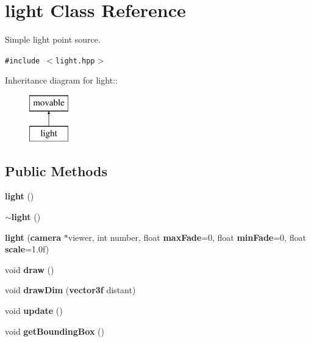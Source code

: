 \section{light  Class Reference}
\label{classlight}
Simple light point source. 


{\tt \#include $<$light.hpp$>$}

Inheritance diagram for light::\begin{figure}[H]
\begin{center}
\leavevmode
\includegraphics[height=2cm]{classlight}
\end{center}
\end{figure}
\subsection*{Public Methods}
\begin{CompactItemize}
\item 
{}
{\bf light} ()\label{classlight_a0}

\item 
{}
{\bf $\sim$light} ()\label{classlight_a1}

\item 
{}
{\bf light} ({\bf camera} $\ast$viewer, int number, float {\bf max\-Fade}=0, float {\bf min\-Fade}=0, float {\bf scale}=1.0f)\label{classlight_a2}

\item 
{}
void {\bf draw} ()\label{classlight_a3}

\item 
{}
void {\bf draw\-Dim} ({\bf vector3f} distant)\label{classlight_a4}

\item 
{}
void {\bf update} ()\label{classlight_a5}

\item 
{}
void {\bf get\-Bounding\-Box} ()\label{classlight_a6}

\end{CompactItemize}
